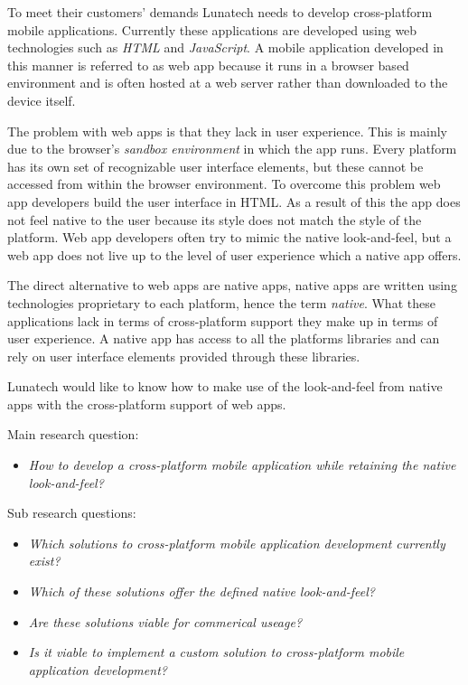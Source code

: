 

To meet their customers' demands Lunatech needs to develop cross-platform mobile applications. Currently these applications are developed using web technologies such as \emph{HTML} and \emph{JavaScript}. A mobile application developed in this manner is referred to as web app because it runs in a browser based environment and is often hosted at a web server rather than downloaded to the device itself.

The problem with web apps is that they lack in user experience. This is mainly due to the browser's \emph{sandbox environment} in which the app runs. Every platform has its own set of recognizable user interface elements, but these cannot be accessed from within the browser environment. To overcome this problem web app developers build the user interface in HTML.  As a result of this the app does not feel native to the user because its style does not match the style of the platform. Web app developers often try to mimic the native look-and-feel, but a web app does not live up to the level of user experience which a native app offers.

The direct alternative to web apps are native apps, native apps are written using technologies proprietary to each platform, hence the term \emph{native}. What these applications lack in terms of cross-platform support they make up in terms of user experience.  A native app has access to all the platforms libraries and can rely on user interface elements provided through these libraries.

Lunatech would like to know how to make use of the look-and-feel from native apps with the cross-platform support of web apps.


Main research question:
\begin{itemize}
\item \emph{How to develop a cross-platform mobile application while retaining the native look-and-feel?}
\end{itemize}

\noindent Sub research questions:
\begin{itemize}
\item \emph{Which solutions to cross-platform mobile application development currently exist?}
\item \emph{Which of these solutions offer the defined native look-and-feel?}
\item \emph{Are these solutions viable for commerical useage?}
\item \emph{Is it viable to implement a custom solution to cross-platform mobile application development?}
\end{itemize}

